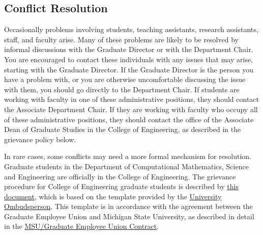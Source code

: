 \subsection{Conflict Resolution}

Occasionally problems involving students, teaching assistants,
research assistants, staff, and faculty arise.  Many of these problems
are likely to be resolved by informal discussions with the Graduate
Director or with the Department Chair.  You are encouraged to contact
these individuals with any issues that may arise, starting with the
Graduate Director.  If the Graduate Director is the person you have a
problem with, or you are otherwise uncomfortable discussing the issue
with them, you should go directly to the Department Chair.  If
students are working with faculty in one of these administrative
positions, they should contact the Associate Department Chair.  If
they are working with faculty who occupy all of these administrative
positions, they should contact the office of the Associate Dean of Graduate Studies
in the College of Engineering, as described in the grievance policy below.

In rare cases, some conflicts may need a more formal
mechanism for resolution.  Graduate students in the Department of
Computational Mathematics, Science and Engineering are officially in
the College of Engineering.  The grievance procedure for College of
Engineering graduate students is described by
\href{https://www.egr.msu.edu/sites/default/files/content/GRAD/2015\%20Grievance\%20Hearing\%20Procedure.pdf}{this
document}, which is based on the template provided by the
\href{https://ombud.msu.edu/}{University
Ombudsperson}.  This template is in accordance with the agreement
between the  Graduate Employee Union and Michigan State University, as
described in detail in the \href{https://www.hr.msu.edu/documents/contracts/GEU2015-2019.pdf}{MSU/Graduate
  Employee Union Contract}.





